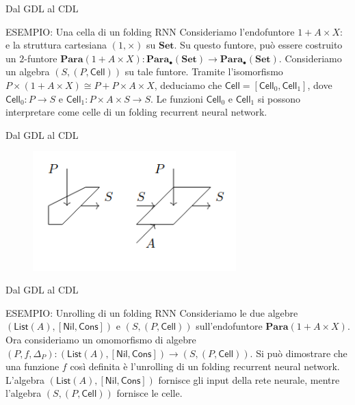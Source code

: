 \documentclass{beamer}
\begin{document}
\begin{frame}{Dal GDL al CDL}
    \begin{block}{ESEMPIO: Una cella di un folding RNN}
        Consideriamo l'endofuntore $1 + A \times X:$ e la struttura cartesiana $(1, \times)$ su $\mathbf{Set}$. Su questo funtore, può essere costruito un $2$-funtore $\mathbf{Para}(1 + A \times X): \mathbf{Para}_{\bullet}(\mathbf{Set}) \to \mathbf{Para}_{\bullet}(\mathbf{Set})$. Consideriamo un algebra $(S,(P,\mathsf{Cell}))$ su tale funtore. Tramite l'isomorfismo $P \times (1 + A \times X) \cong P + P \times A \times X$, deduciamo che $\mathsf{Cell} = [\mathsf{Cell}_0, \mathsf{Cell}_1]$, dove $\mathsf{Cell}_0: P \to S$ e  $\mathsf{Cell}_1: P \times A \times S \to S$. Le funzioni $\mathsf{Cell}_0$ e $\mathsf{Cell}_1$ si possono interpretare come celle di un folding recurrent neural network.
    \end{block}
\end{frame}

\begin{frame}{Dal GDL al CDL}
    \begin{figure}
        \begin{center}
            \includegraphics[width=0.7\textwidth]{figures/folding_rnn_cell.png}
            \caption*{}
        \end{center}
    \end{figure}
\end{frame}

\begin{frame}{Dal GDL al CDL}
    \begin{block}{ESEMPIO: Unrolling di un folding RNN}
        Consideriamo le due algebre $(\mathsf{List}(A), [\mathsf{Nil}, \mathsf{Cons}])$ e $(S,(P,\mathsf{Cell}))$ sull'endofuntore $\mathbf{Para}(1 + A \times X)$.
        Ora consideriamo un omomorfismo di algebre $(P,f,\Delta_P): (\mathsf{List}(A), [\mathsf{Nil}, \mathsf{Cons}]) \to (S,(P,\mathsf{Cell}))$. Si può dimostrare che una funzione $f$ così definita è l'unrolling di un folding recurrent neural network. L'algebra $(\mathsf{List}(A), [\mathsf{Nil}, \mathsf{Cons}])$ fornisce gli input della rete neurale, mentre l'algebra $(S,(P,\mathsf{Cell}))$ fornisce le celle.
    \end{block}
\end{frame}
\end{document}
